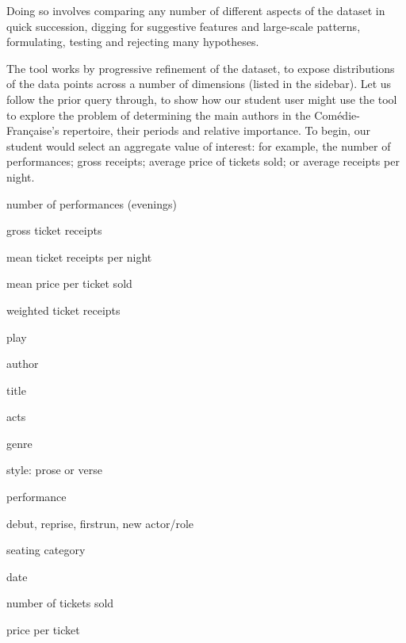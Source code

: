 \documentclass[	DIV=calc,%
							paper=a4,%
							fontsize=11pt,%
							twocolumn]{scrartcl}	 					%
\begin{document}
Doing so involves comparing any number of different aspects of the dataset in quick succession, digging for suggestive features and large-scale patterns, formulating, testing and rejecting many hypotheses.

The tool works by progressive refinement of the dataset, to expose distributions of the data points across a number of dimensions (listed in the sidebar).  Let us follow the prior query through, to show how our student user might use the tool to explore the problem of determining the main authors in the Comédie-Française’s repertoire, their periods and relative importance.  To begin, our student would select an aggregate value of interest: for example, the number of performances; gross receipts; average price of tickets sold; or average receipts per night.

\begin{framefloat}
	\fontsize{9pt}{9pt}\selectfont
  \begin{description}[noitemsep,align=left]

		\item[Measures]
			\item number of performances (evenings)
			\item gross ticket receipts
			\item mean ticket receipts per night
			\item mean price per ticket sold
			\item weighted ticket receipts

    \vspace{10pt}
		\item[Dimensions]
			\item play
			\item author
			\item title
			\item acts
			\item genre
			\item style: prose or verse
			\item performance
			\item debut, reprise, firstrun, new actor/role
			\item seating category

    \hrulefill
		\item[Facts]
			\item date
			\item number of tickets sold
			\item price per ticket
  \end{description}
\end{framefloat}
\end{document}
